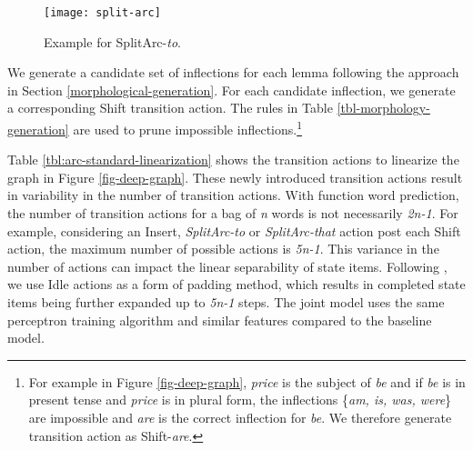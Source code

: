 \documentclass[11pt]{article}
\begin{document}
\begin{figure}[t]
\centering
\small
\texttt{[image: split-arc]}
\caption{Example for {\sc SplitArc}-{\it to}.}\label{fig:split-arc}
\vspace*{-1em}
\end{figure}

We generate a candidate set of inflections for each lemma following the approach in Section \ref{morphological-generation}. For each candidate inflection, we generate a corresponding {\sc Shift} transition action. The rules in Table \ref{tbl-morphology-generation} are used to prune impossible inflections.\footnote{For example in Figure \ref{fig-deep-graph}, {\it price} is the subject of {\it be} and if {\it be} is in present tense and {\it price} is in plural form, the inflections \{{\it am, is, was, were}\} are impossible and {\it are} is the correct inflection for {\it be}. We therefore generate transition action as {\sc Shift}-{\it are}.}

Table \ref{tbl:arc-standard-linearization} shows the transition actions to linearize the graph in Figure \ref{fig-deep-graph}. These newly introduced transition actions result in variability in the number of transition actions. With function word prediction, the number of transition actions for a bag of {\it n} words is not necessarily {\it 2n-1}. For example, considering an {\sc Insert}, {\it {\sc SplitArc}-to} or {\it {\sc  SplitArc}-that} action post each {\sc Shift} action, the maximum number of possible actions is {\it 5n-1}. This variance in the number of actions can impact the linear separability of state items. Following , we use {\sc Idle} actions as a form of padding method, which results in completed state items being further expanded up to {\it 5n-1} steps. The joint model uses the same perceptron training algorithm and similar features compared to the baseline model.
\end{document}
